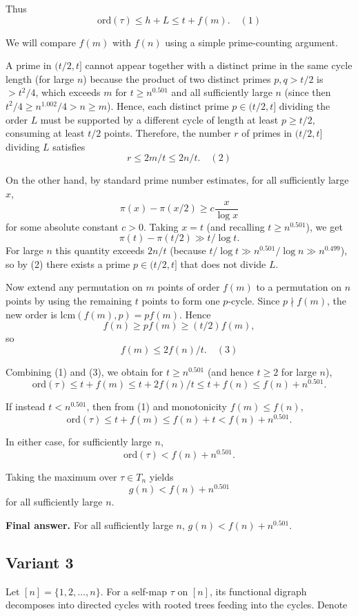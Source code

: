 \documentclass[12pt,a4paper]{article}
\theoremstyle{definition}
\begin{document}
    Thus
    $$\text{ord}(\tau) \leq h + L \leq t + f(m). \quad (1)$$

    We will compare $f(m)$ with $f(n)$ using a simple prime-counting argument.

    A prime in $(t/2, t]$ cannot appear together with a distinct prime in the same cycle length (for large $n$) because the product of two distinct primes $p, q > t/2$ is $> t^2/4$, which exceeds $m$ for $t \geq n^{0.501}$ and all sufficiently large $n$ (since then $t^2/4 \geq n^{1.002}/4 > n \geq m$). Hence, each distinct prime $p \in (t/2, t]$ dividing the order $L$ must be supported by a different cycle of length at least $p \geq t/2$, consuming at least $t/2$ points. Therefore, the number $r$ of primes in $(t/2, t]$ dividing $L$ satisfies
    $$r \leq 2m/t \leq 2n/t. \quad (2)$$

    On the other hand, by standard prime number estimates, for all sufficiently large $x$,
    $$\pi(x) - \pi(x/2) \geq c \frac{x}{\log x}$$
    for some absolute constant $c > 0$. Taking $x = t$ (and recalling $t \geq n^{0.501}$), we get
    $$\pi(t) - \pi(t/2) \gg t / \log t.$$
    For large $n$ this quantity exceeds $2n/t$ (because $t/\log t \gg n^{0.501} / \log n \gg n^{0.499}$), so by (2) there exists a prime $p \in (t/2, t]$ that does not divide $L$.

    Now extend any permutation on $m$ points of order $f(m)$ to a permutation on $n$ points by using the remaining $t$ points to form one $p$-cycle. Since $p \nmid f(m)$, the new order is $\text{lcm}(f(m), p) = p f(m)$. Hence
    $$f(n) \geq p f(m) \geq (t/2) f(m),$$
    so
    $$f(m) \leq 2 f(n) / t. \quad (3)$$

    Combining (1) and (3), we obtain for $t \geq n^{0.501}$ (and hence $t \geq 2$ for large $n$),
    $$\text{ord}(\tau) \leq t + f(m) \leq t + 2 f(n)/t \leq t + f(n) \leq f(n) + n^{0.501}.$$

    If instead $t < n^{0.501}$, then from (1) and monotonicity $f(m) \leq f(n)$,
    $$\text{ord}(\tau) \leq t + f(m) \leq f(n) + t < f(n) + n^{0.501}.$$

    In either case, for sufficiently large $n$,
    $$\text{ord}(\tau) < f(n) + n^{0.501}.$$

    Taking the maximum over $\tau \in T_n$ yields
    $$g(n) < f(n) + n^{0.501}$$
    for all sufficiently large $n$.

    \textbf{Final answer.}
    For all sufficiently large $n$, $g(n) < f(n) + n^{0.501}$.

    \subsection{Variant 3}
    Let $[n] = \{1,2,\ldots,n\}$. For a self-map $\tau$ on $[n]$, its functional digraph decomposes into directed cycles with rooted trees feeding into the cycles. Denote
\end{document}
